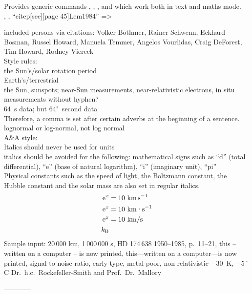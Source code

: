 Provides generic commands \degree, \celsius, \perthousand, \micro{} and \ohm{} which work both in text and maths mode.\\

\citet{Lem1984}, \citep{Lem1984}, ``citep[see][page 45]{Lem1984}'' => \citep[see][page 45]{Lem1984}

included persons via citations:
Volker Bothmer, Rainer Schwenn, Eckhard Bosman, Russel Howard, Manuela Temmer, Angelos Vourlidas, Craig DeForest, Tim Howard, Rodney Viereck\\

Style rules:\\
the Sun's/solar rotation period\\
Earth's/terrestrial\\
the Sun, sunspots; near-Sun measurements, near-relativistic electrons, in situ measurements without hyphen?\\
64~s data; but 64"~second data\\
Therefore, a comma is set after certain adverbs at the beginning of a sentence.\\
lognormal or log-normal, not log normal\\

A\&A style:\\
Italics should never be used for units\\
italics should be avoided for the following: mathematical signs such as ``d'' (total differential), ``e'' (base of natural logarithm), ``i'' (imaginary unit), ``pi''\\
Physical constants such as the speed of light, the Boltzmann constant, the Hubble constant and the solar mass are also set in regular italics.\\
\begin{align}
	\text{e}^x &= 10~\text{km\,s}^{-1}\\
	\text{e}^x &= 10~\text{km\textperiodcentered s}^{-1}\\
	\text{e}^x &= 10~\text{km/s}\\
	k_\text{B}
\end{align}
Sample input:
20\,000 km, 1\,000\,000 s, HD 174\,638 1950--1985, p.~11--21, this -- written on a computer -- is now printed, this---written on a computer---is now printed, signal-to-noise ratio, early-type, metal-poor, non-relativistic $-30$~K, $-5\ ^{\circ}$C Dr.~h.c.~Rockefeller-Smith and Prof.~Dr.~Mallory

------------\\

